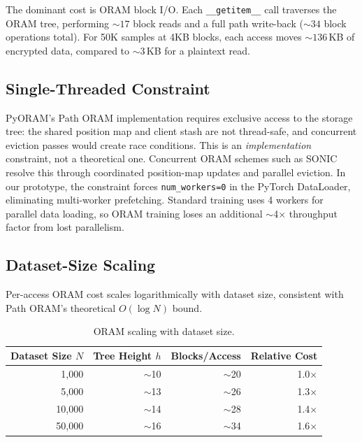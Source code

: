 \documentclass[11pt]{article}
\begin{document}
The dominant cost is ORAM block I/O.
Each \texttt{\_\_getitem\_\_} call traverses the ORAM tree, performing ${\sim}17$ block reads and a full path write-back (${\sim}34$ block operations total).
For 50K samples at 4KB blocks, each access moves ${\sim}136$\,KB of encrypted data, compared to ${\sim}3$\,KB for a plaintext read.

\subsection{Single-Threaded Constraint}

PyORAM's Path ORAM implementation requires exclusive access to the storage tree: the shared position map and client stash are not thread-safe, and concurrent eviction passes would create race conditions.
This is an \emph{implementation} constraint, not a theoretical one. Concurrent ORAM schemes such as SONIC~\cite{talur2026} resolve this through coordinated position-map updates and parallel eviction.
In our prototype, the constraint forces \texttt{num\_workers=0} in the PyTorch DataLoader, eliminating multi-worker prefetching.
Standard training uses 4 workers for parallel data loading, so ORAM training loses an additional $\sim$4$\times$ throughput factor from lost parallelism.

\subsection{Dataset-Size Scaling}

Per-access ORAM cost scales logarithmically with dataset size, consistent with Path ORAM's theoretical $O(\log N)$ bound.

\begin{table}[ht]
\centering
\caption{ORAM scaling with dataset size.}
\label{tab:scaling}
\begin{tabular}{@{}rrrr@{}}
\toprule
\textbf{Dataset Size $N$} & \textbf{Tree Height $h$} & \textbf{Blocks/Access} & \textbf{Relative Cost} \\
\midrule
1,000   & $\sim$10 & $\sim$20 & 1.0$\times$ \\
5,000   & $\sim$13 & $\sim$26 & 1.3$\times$ \\
10,000  & $\sim$14 & $\sim$28 & 1.4$\times$ \\
50,000  & $\sim$16 & $\sim$34 & 1.6$\times$ \\
\bottomrule
\end{tabular}
\end{table}
\end{document}
